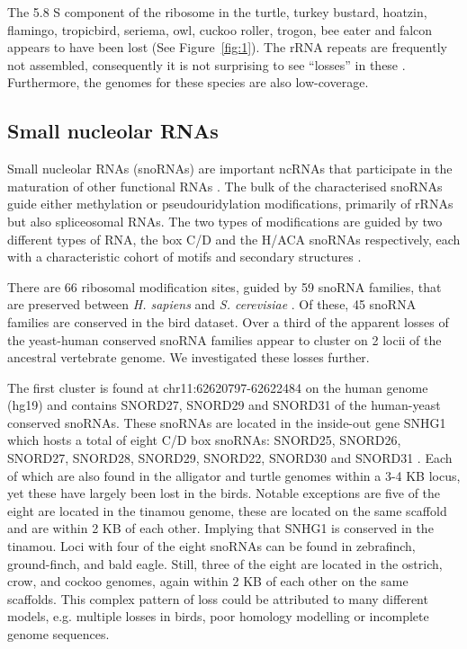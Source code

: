 \documentclass[10pt]{bmc_article}
\newenvironment{bmcformat}{\begin{raggedright}\baselineskip20pt\sloppy\setboolean{publ}{false}}{\end{raggedright}\baselineskip20pt\sloppy}
\begin{document}
\begin{bmcformat}
The 5.8 S component of the ribosome in the turtle, turkey bustard,
hoatzin, flamingo, tropicbird, seriema, owl, cuckoo roller, trogon,
bee eater and falcon appears to have been lost (See
Figure~\ref{fig:1}). The rRNA repeats are frequently not assembled,
consequently it is not surprising to see ``losses'' in these \cite{Floutsakou:2013}.
Furthermore, the genomes for these species are also
low-coverage.


\subsection*{Small nucleolar RNAs}

Small nucleolar RNAs (snoRNAs) are important ncRNAs that participate
in the maturation of other functional RNAs \cite{Gardner:2010}. The
bulk of the characterised snoRNAs guide either methylation or
pseudouridylation modifications, primarily of rRNAs but also
spliceosomal RNAs. The two types of modifications are guided by two
different types of RNA, the box C/D and the H/ACA snoRNAs
respectively, each with a characteristic cohort of motifs and
secondary structures \cite{Marz:2011}.

There are 66 ribosomal modification sites, guided by 59 snoRNA
families, that are preserved between \emph{H. sapiens} and
\emph{S. cerevisiae} \cite{Lestrade:2006}. Of these, 45 snoRNA
families are conserved in the bird dataset.
Over a third of the apparent losses of the yeast-human conserved
snoRNA families appear to cluster on 2 locii of the ancestral
vertebrate genome. We investigated these losses further.

The first cluster is found at chr11:62620797-62622484 on the human
genome (hg19) and contains SNORD27, SNORD29 and SNORD31 of the
human-yeast conserved snoRNAs. These snoRNAs are located in the
inside-out gene SNHG1 which hosts a total of eight C/D box snoRNAs:
SNORD25, SNORD26, SNORD27, SNORD28, SNORD29, SNORD22, SNORD30 and
SNORD31 \cite{Tycowski:1996}. Each of which are also found in the
alligator and turtle genomes within a 3-4 KB locus, yet these have
largely been lost in the birds. Notable exceptions are five of the
eight are located in the tinamou genome, these are located on the same
scaffold and are within 2 KB of each other. Implying that SNHG1 is
conserved in the tinamou. Loci with four of the eight snoRNAs can be
found in zebrafinch, ground-finch, and bald eagle. Still, three of the
eight are located in the ostrich, crow, and cockoo genomes, again
within 2 KB of each other on the same scaffolds. This complex pattern
of loss could be attributed to many different models, e.g. multiple
losses in birds, poor homology modelling or incomplete genome
sequences.


\end{bmcformat}
\end{document}

